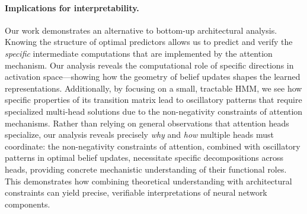 \documentclass{article}
\theoremstyle{plain}
\theoremstyle{definition}
\theoremstyle{remark}
\begin{document}
\paragraph{Implications for interpretability.}
Our work demonstrates an alternative to bottom-up architectural analysis.
Knowing the structure of optimal predictors allows us to predict and verify the \emph{specific} intermediate computations that are 
implemented %
by the attention mechanism.
Our analysis reveals the computational role of specific directions in activation space—showing how the geometry of belief updates shapes the learned representations.
Additionally, by focusing on a small, tractable HMM, we see how specific properties of its transition matrix lead to oscillatory patterns that require specialized multi-head solutions due to the non-negativity constraints of attention mechanisms.
Rather than relying on general observations that attention heads specialize, our analysis reveals precisely \emph{why} and \emph{how} multiple heads must coordinate: 
the non-negativity constraints of attention, combined with oscillatory patterns in optimal belief updates, necessitate specific decompositions across heads, providing concrete mechanistic understanding of their functional roles.
This demonstrates how combining theoretical understanding with architectural constraints can yield precise, verifiable interpretations of neural network components.

\end{document}
